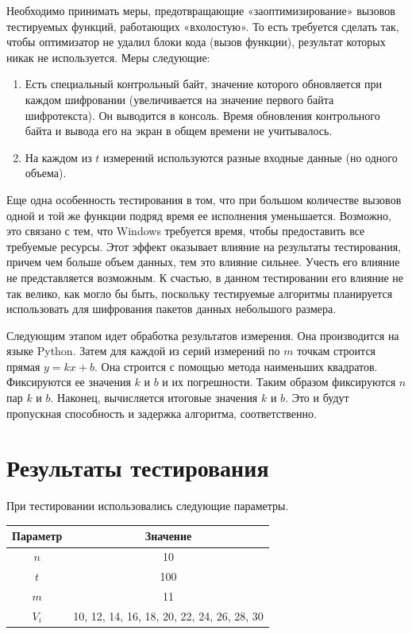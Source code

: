 Необходимо принимать меры, предотвращающие «заоптимизирование» вызовов тестируемых функций, работающих «вхолостую». То есть требуется сделать так, чтобы оптимизатор не удалил блоки кода (вызов функции), результат которых никак не используется. Меры следующие:
\begin{enumerate}
	\item Есть специальный контрольный байт, значение которого обновляется при каждом шифровании (увеличивается на значение первого байта шифротекста). Он выводится в консоль. Время обновления контрольного байта и вывода его на экран в общем времени не учитывалось.
	\item На каждом из $t$ измерений используются разные входные данные (но одного объема).
\end{enumerate} 

Еще одна особенность тестирования в том, что при большом количестве вызовов одной и той же функции подряд время ее исполнения уменьшается. Возможно, это связано с тем, что Windows требуется время, чтобы предоставить все требуемые ресурсы. Этот эффект оказывает влияние на результаты тестирования, причем чем больше объем данных, тем это влияние сильнее. Учесть его влияние не представляется возможным. К счастью, в данном тестировании его влияние не так велико, как могло бы быть, поскольку тестируемые алгоритмы планируется использовать для шифрования пакетов данных небольшого размера. 

Следующим этапом идет обработка результатов измерения. Она производится на языке Python. Затем для каждой из серий измерений по $m$ точкам строится прямая $y=kx+b$. Она строится с помощью метода наименьших квадратов. Фиксируются ее значения $k$ и $b$ и их погрешности. Таким образом фиксируются $n$ пар $k$ и $b$. Наконец, вычисляется итоговые значения $k$ и $b$. Это и будут пропускная способность и задержка алгоритма, соответственно.

\section{Результаты тестирования} \label{ch4:sec2}

При тестировании использовались следующие параметры.

\begin{center}
	\begin{tabular}{ | c | c | }
		\hline
		Параметр & Значение \\ \hline
		$n$ & 10 \\ \hline
		$t$ & 100 \\ \hline
		$m$ & 11 \\ \hline
		$V_i$ & 10, 12, 14, 16, 18, 20, 22, 24, 26, 28, 30 \\
		\hline
	\end{tabular}
\end{center}

